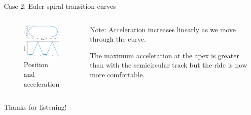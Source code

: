 \documentclass{beamer}
\begin{document}
\begin{frame}{Case 2: Euler spiral transition curves}
	\begin{columns}
		\begin{column}{0.8\textwidth}			
			\begin{figure}
				\caption{Position and acceleration}
				\centering
				\includegraphics[width=70mm, scale=0.2]{euler_track.png}
			\end{figure}
		\end{column}
		\begin{column}{0.33\textwidth}
			Note: Acceleration increases linearly as we move through the curve.
			
			The maximum acceleration at the apex is greater than with the semicircular track but the ride is now more comfortable.
					
		\end{column}
	\end{columns}

\end{frame}



\begin{frame}
	\centering
	Thanks for listening!
	 
\end{frame}
\end{document}
